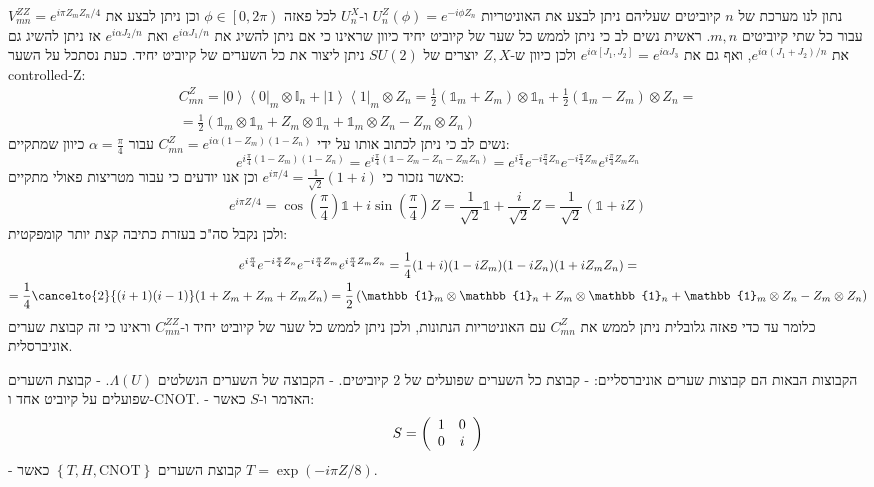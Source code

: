 \documentclass{tstextbook}
\begin{document}
\begin{example}
נתון לנו מערכת של \(n\) קיוביטים שעליהם ניתן לבצע את האוניטריות \(U_{n}^{Z}\left( \phi \right)=e^{ -i\phi Z_{n} }\) ו-\(U_{n}^{X}\) לכל פאזה \(\phi \in \left[ 0,2\pi \right)\) וכן ניתן לבצע את \(V_{mn}^{Z Z}=e^{ i\pi Z_{m}Z_{n}/4 }\) עבור כל שתי קיוביטים \(m,n\). ראשית נשים לב כי ניתן לממש כל שער של קיוביט יחיד כיוון שראינו כי אם ניתן להשיג את \(e^{ i\alpha J_{1}/n  }\) ואת \(e^{ i\alpha J_{2}/n }\) אז ניתן להשיג גם את \(e^{ i\alpha(J_{1}+J_{2})/n }\), ואף גם את \(e^{ i\alpha [J_{1},J_{2}] }=e^{ i\alpha J_{3} }\) ולכן כיוון ש-\(Z,X\) יוצרים של \(SU(2)\) ניתן ליצור את כל השערים של קיוביט יחיד. כעת נסתכל על השער controlled-Z:
\begin{gather*}C_{m n}^{Z}=\left|0\right\rangle\left\langle0\right|_{m}\otimes\mathbb{I}_{n}+\left|1\right\rangle\left\langle1\right|_{m}\otimes Z_{n}=\frac{1}{2}\left( \mathbb{1}_{m} +Z_{m} \right)\otimes \mathbb{1}_{n} +\frac{1}{2}\left( \mathbb{1}_{m} -Z_{m} \right)\otimes Z_{n} = \\=\frac{1}{2}\left( \mathbb{1}_{m} \otimes \mathbb{1} _{n} +Z_{m}\otimes \mathbb{1} _{n}+\mathbb{1} _{m}\otimes Z_{n}-Z_{m}\otimes Z_{n} \right)
\end{gather*}
נשים לב כי ניתן לכתוב אותו על ידי \(C_{mn}^{Z}=e^{ i\alpha(1-Z_{m})(1-Z_{n}) }\) עבור \(\alpha=\frac{\pi}{4}\) כיוון שמתקיים:
$$e^{ i\frac{\pi}{4}(1-Z_{m})(1-Z_{n}) }=e^{ i\frac{\pi}{4} \left( \mathbb{1} -Z_{m} -Z_{n}-Z_{m}Z_{n}\right)}=e^{ i\frac{\pi}{4} }e^{ -i\frac{\pi}{4} Z_{n} }e^{ -i\frac{\pi}{4}Z_{m} }e^{ i\frac{\pi}{4} Z_{m}Z_{n} }$$
כאשר נזכור כי \(e^{ i\pi/4 }=\frac{1}{\sqrt{ 2 }}(1+i)\) וכן אנו יודעים כי עבור מטריצות פאולי מתקיים:
$$e^{ i\pi Z/4 }=\cos\left( \frac{\pi}{4} \right)\mathbb{1} +i\sin\left( \frac{\pi}{4} \right)Z=\frac{1}{\sqrt{ 2 }}\mathbb{1} +\frac{i}{\sqrt{ 2 }}Z=\frac{1}{\sqrt{ 2 }}\left( \mathbb{1} +iZ \right)$$
ולכן נקבל סה"כ בעזרת כתיבה קצת יותר קומפקטית:
\begin{gather*}e^{ i\frac{\pi}{4} }e^{ -i\frac{\pi}{4} Z_{n} }e^{ -i\frac{\pi}{4}Z_{m} }e^{ i\frac{\pi}{4} Z_{m}Z_{n} }=\frac{1}{4}(1+i)(1-iZ_{m})(1-iZ_{n})(1+iZ_{m}Z_{n})=  \\=\frac{1}{4}\cancelto{ 2 }{ (i+1)(i-1) }(1+Z_{m}+Z_{m}+Z_{m}Z_{n})=\frac{1}{2}\left( \mathbb{1}_{m} \otimes \mathbb{1} _{n} +Z_{m}\otimes \mathbb{1} _{n}+\mathbb{1} _{m}\otimes Z_{n}-Z_{m}\otimes Z_{n} \right)
\end{gather*}
כלומר עד כדי פאזה גלובלית ניתן לממש את \(C_{mn}^{Z}\) עם האוניטריות הנתונות, ולכן ניתן לממש כל שער של קיוביט יחיד ו-\(C_{mn}^{Z Z}\) וראינו כי זה קבוצת שערים אוניברסלית.

\end{example}
\begin{summary}
הקבוצות הבאות הם קבוצות שערים אוניברסליים:
- קבוצת כל השערים שפועלים של 2 קיוביטים.
- הקבוצה של השערים הנשלטים \(\Lambda(U)\).
- קבוצת השערים שפועלים על קיוביט אחד ו-CNOT.
- האדמר ו-\(S\) כאשר:
$$S=\left(\begin{array}{c c}{{1}}&{{0}}\\ {{0}}&{{i}}\end{array}\right)$$
- קבוצת השערים \(\left\{  T,H,\mathrm{CNOT}  \right\}\) כאשר \(T=\exp\left(-i\pi Z/8\right)\).

\end{summary}
\end{document}
